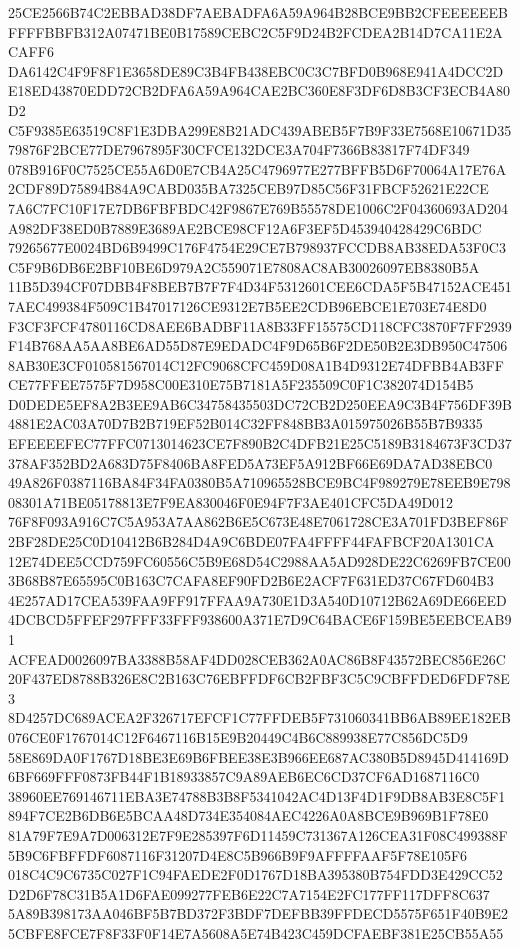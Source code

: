 \documentclass[UTF8,fontset=fandol,zihao=-4,a4paper]{ctexart}
\begin{document}
{{25CE2566B74C2EBBAD38DF7AEBADFA6A59A964B28BCE9BB2CFEEEEEEBFFFFBBFB312A07471BE0B17589CEBC2C5F9D24B2FCDEA2B14D7CA11E2ACAFF6
DA6142C4F9F8F1E3658DE89C3B4FB438EBC0C3C7BFD0B968E941A4DCC2DE18ED43870EDD72CB2DFA6A59A964CAE2BC360E8F3DF6D8B3CF3ECB4A80D2
C5F9385E63519C8F1E3DBA299E8B21ADC439ABEB5F7B9F33E7568E10671D3579876F2BCE77DE7967895F30CFCE132DCE3A704F7366B83817F74DF349
078B916F0C7525CE55A6D0E7CB4A25C4796977E277BFFB5D6F70064A17E76A2CDF89D75894B84A9CABD035BA7325CEB97D85C56F31FBCF52621E22CE
7A6C7FC10F17E7DB6FBFBDC42F9867E769B55578DE1006C2F04360693AD204A982DF38ED0B7889E3689AE2BCE98CF12A6F3EF5D453940428429C6BDC
79265677E0024BD6B9499C176F4754E29CE7B798937FCCDB8AB38EDA53F0C3C5F9B6DB6E2BF10BE6D979A2C559071E7808AC8AB30026097EB8380B5A
11B5D394CF07DBB4F8BEB7B7F7F4D34F5312601CEE6CDA5F5B47152ACE4517AEC499384F509C1B47017126CE9312E7B5EE2CDB96EBCE1E703E74E8D0
F3CF3FCF4780116CD8AEE6BADBF11A8B33FF15575CD118CFC3870F7FF2939F14B768AA5AA8BE6AD55D87E9EDADC4F9D65B6F2DE50B2E3DB950C47506
8AB30E3CF010581567014C12FC9068CFC459D08A1B4D9312E74DFBB4AB3FFCE77FFEE7575F7D958C00E310E75B7181A5F235509C0F1C382074D154B5
D0DEDE5EF8A2B3EE9AB6C34758435503DC72CB2D250EEA9C3B4F756DF39B4881E2AC03A70D7B2B719EF52B014C32FF848BB3A015975026B55B7B9335
EFEEEEFEC77FFC0713014623CE7F890B2C4DFB21E25C5189B3184673F3CD37378AF352BD2A683D75F8406BA8FED5A73EF5A912BF66E69DA7AD38EBC0
49A826F0387116BA84F34FA0380B5A710965528BCE9BC4F989279E78EEB9E79808301A71BE05178813E7F9EA830046F0E94F7F3AE401CFC5DA49D012
76F8F093A916C7C5A953A7AA862B6E5C673E48E7061728CE3A701FD3BEF86F2BF28DE25C0D10412B6B284D4A9C6BDE07FA4FFFF44FAFBCF20A1301CA
12E74DEE5CCD759FC60556C5B9E68D54C2988AA5AD928DE22C6269FB7CE003B68B87E65595C0B163C7CAFA8EF90FD2B6E2ACF7F631ED37C67FD604B3
4E257AD17CEA539FAA9FF917FFAA9A730E1D3A540D10712B62A69DE66EED4DCBCD5FFEF297FFF33FFF938600A371E7D9C64BACE6F159BE5EEBCEAB91
ACFEAD0026097BA3388B58AF4DD028CEB362A0AC86B8F43572BEC856E26C20F437ED8788B326E8C2B163C76EBFFDF6CB2FBF3C5C9CBFFDED6FDF78E3
8D4257DC689ACEA2F326717EFCF1C77FFDEB5F731060341BB6AB89EE182EB076CE0F1767014C12F6467116B15E9B20449C4B6C889938E77C856DC5D9
58E869DA0F1767D18BE3E69B6FBEE38E3B966EE687AC380B5D8945D414169D6BF669FFF0873FB44F1B18933857C9A89AEB6EC6CD37CF6AD1687116C0
38960EE769146711EBA3E74788B3B8F5341042AC4D13F4D1F9DB8AB3E8C5F1894F7CE2B6DB6E5BCAA48D734E354084AEC4226A0A8BCE9B969B1F78E0
81A79F7E9A7D006312E7F9E285397F6D11459C731367A126CEA31F08C499388F5B9C6FBFFDF6087116F31207D4E8C5B966B9F9AFFFFAAF5F78E105F6
018C4C9C6735C027F1C94FAEDE2F0D1767D18BA395380B754FDD3E429CC52D2D6F78C31B5A1D6FAE099277FEB6E22C7A7154E2FC177FF117DFF8C637
5A89B398173AA046BF5B7BD372F3BDF7DEFBB39FFDECD5575F651F40B9E25CBFE8FCE7F8F33F0F14E7A5608A5E74B423C459DCFAEBF381E25CB55A55
}}
\end{document}
